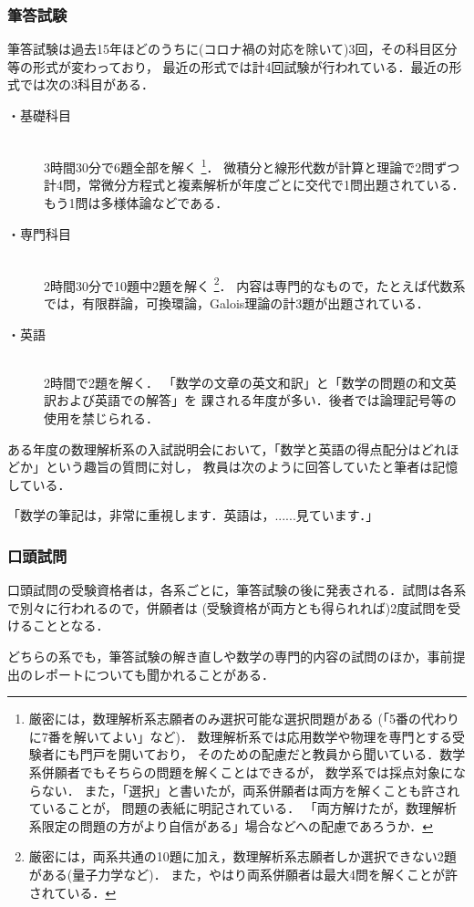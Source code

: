 \documentclass[uplatex]{jsarticle}
\begin{document}
\subsubsection*{筆答試験}
筆答試験は過去15年ほどのうちに(コロナ禍の対応を除いて)3回，その科目区分等の形式が変わっており，
最近の形式では計4回試験が行われている．最近の形式では次の3科目がある．
\begin{description}
\item[・基礎科目]\mbox{}\\ 3時間30分で6題全部を解く
\footnote{厳密には，数理解析系志願者のみ選択可能な選択問題がある
	(「5番の代わりに7番を解いてよい」など)．
	数理解析系では応用数学や物理を専門とする受験者にも門戸を開いており，
	そのための配慮だと教員から聞いている．数学系併願者でもそちらの問題を解くことはできるが，
	数学系では採点対象にならない．
	また，「選択」と書いたが，両系併願者は両方を解くことも許されていることが，
	問題の表紙に明記されている．
	「両方解けたが，数理解析系限定の問題の方がより自信がある」場合などへの配慮であろうか．}．
微積分と線形代数が計算と理論で2問ずつ計4問，常微分方程式と複素解析が年度ごとに交代で1問出題されている．
もう1問は多様体論などである．
\item[・専門科目]\mbox{}\\ 2時間30分で10題中2題を解く
\footnote{厳密には，両系共通の10題に加え，数理解析系志願者しか選択できない2題がある(量子力学など)．
また，やはり両系併願者は最大4問を解くことが許されている．}．
内容は専門的なもので，たとえば代数系では，有限群論，可換環論，Galois理論の計3題が出題されている．
\item[・英語]\mbox{}\\ 2時間で2題を解く．
「数学の文章の英文和訳」と「数学の問題の和文英訳および英語での解答」を
課される年度が多い．後者では論理記号等の使用を禁じられる．	
\end{description}
ある年度の数理解析系の入試説明会において，「数学と英語の得点配分はどれほどか」という趣旨の質問に対し，
教員は次のように回答していたと筆者は記憶している．

「数学の筆記は，非常に重視します．英語は，......見ています．」
\subsubsection*{口頭試問}
口頭試問の受験資格者は，各系ごとに，筆答試験の後に発表される．試問は各系で別々に行われるので，併願者は
(受験資格が両方とも得られれば)2度試問を受けることとなる．

どちらの系でも，筆答試験の解き直しや数学の専門的内容の試問のほか，事前提出のレポートについても聞かれることがある．
\end{document}
